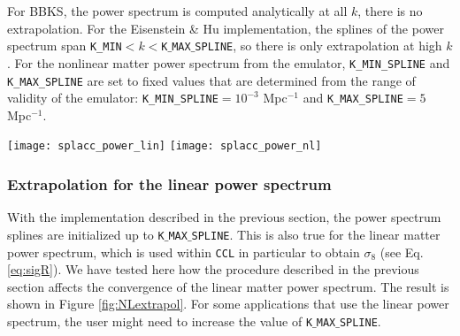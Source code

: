 \documentclass[\docopts]{\docclass}
\newcommand{\ccl}{{\tt CCL}\xspace}
\begin{document}
For BBKS, the power spectrum is computed analytically at all $k$, there is no
extrapolation. For the Eisenstein \& Hu implementation, the splines of the power
spectrum span {\tt K\_MIN}$<k<${\tt K$\_$MAX$\_$SPLINE}, so there is only
extrapolation at high $k$. For the nonlinear matter power spectrum from the
emulator, {\tt K\_MIN\_SPLINE} and {\tt K\_MAX\_SPLINE} are set to fixed values
that are determined from the range of validity of the emulator:
{\tt K\_MIN\_SPLINE}$=10^{-3}$ Mpc$^{-1}$ and {\tt K\_MAX\_SPLINE}$=5$ Mpc$^{-1}$.


\begin{figure*}
\centering
  \texttt{[image: splacc\_power\_lin]}
  \texttt{[image: splacc\_power\_nl]}
\caption{
    The relative error compared to power spectra produced with high values of the
    power spectrum splines, $P_{fid}$, produced by splining the matter power
    spectrum up to {\tt K$\_$MAX$\_$SPLINE}$=50\,\text{Mpc}^{-1}$ and extrapolating
    beyond this value with a second order Taylor expansion the natural logarithm of
    the matter power spectrum. The left panel shows the relative errors for the
    linear matter power spectrum at $z=0$, $z=3$ and $z=20$. The right panel shows
    the results for the non-linear matter power spectrum at the same redshifts. The
    standard \ccl parameters adopted are those corresponding to the black dashed
    curve. For comparison, the impact of baryonic physics on the matter power
    spectrum is $\sim 10\%$ at $k=1\,\text{Mpc}^{-1}$ \citep{Schneider15}.}
\label{fig:NLextrapol}
\end{figure*}

\subsubsection{Extrapolation for the linear power spectrum}
\label{sec:Lextrapol}

With the implementation described in the previous section, the power spectrum
splines are initialized up to {\tt K$\_$MAX$\_$SPLINE}. This is also true for
the linear matter power spectrum, which is used within \ccl in particular to
obtain $\sigma_8$ (see Eq. \ref{eq:sigR}). We have tested here how the procedure
described in the previous section affects the convergence of the linear
matter power spectrum. The result is shown in Figure \ref{fig:NLextrapol}. For
some applications that use the linear power spectrum, the user might need to
increase the value of {\tt K$\_$MAX$\_$SPLINE}.
\end{document}

